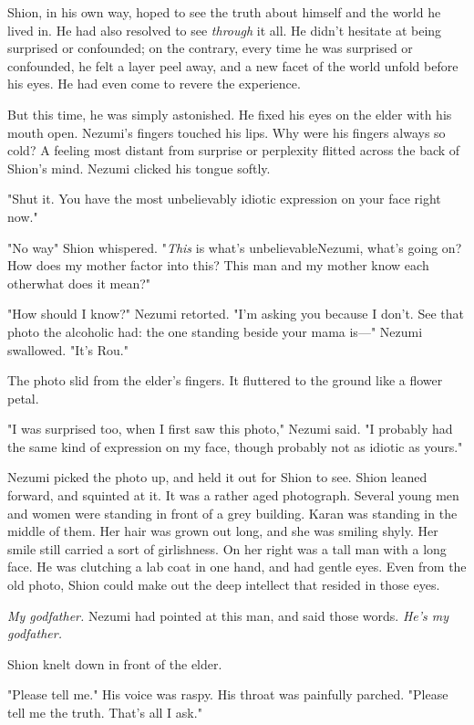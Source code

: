 Shion, in his own way, hoped to see the truth about himself and the
world he lived in. He had also resolved to see \emph{through} it all. He didn't
hesitate at being surprised or confounded; on the contrary, every time
he was surprised or confounded, he felt a layer peel away, and a new
facet of the world unfold before his eyes. He had even come to revere
the experience.

But this time, he was simply astonished. He fixed his eyes on the elder
with his mouth open. Nezumi's fingers touched his lips. Why were his
fingers always so cold? A feeling most distant from surprise or
perplexity flitted across the back of Shion's mind. Nezumi clicked his
tongue softly.

"Shut it. You have the most unbelievably idiotic expression on your face
right now."

"No way\el " Shion whispered. "\emph{This} is what's unbelievable\el Nezumi,
what's going on? How does my mother factor into this? This man and my
mother know each other\el what does it mean?"

"How should I know?" Nezumi retorted. "I'm asking you because I don't.
See that photo the alcoholic had: the one standing beside your mama is---"
Nezumi swallowed. "It's Rou."

The photo slid from the elder's fingers. It fluttered to the ground like
a flower petal.

"I was surprised too, when I first saw this photo," Nezumi said. "I
probably had the same kind of expression on my face, though probably not
as idiotic as yours."

Nezumi picked the photo up, and held it out for Shion to see. Shion
leaned forward, and squinted at it. It was a rather aged photograph.
Several young men and women were standing in front of a grey building.
Karan was standing in the middle of them. Her hair was grown out long,
and she was smiling shyly. Her smile still carried a sort of
girlishness. On her right was a tall man with a long face. He was
clutching a lab coat in one hand, and had gentle eyes. Even from the old
photo, Shion could make out the deep intellect that resided in those
eyes.

\emph{My godfather.} Nezumi had pointed at this man, and said those words. \emph{He's
my godfather.}

Shion knelt down in front of the elder.

"Please tell me." His voice was raspy. His throat was painfully parched.
"Please tell me the truth. That's all I ask."


